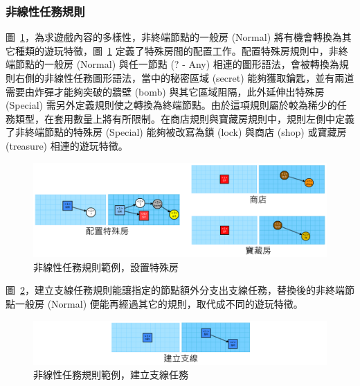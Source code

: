 \subsubsection{非線性任務規則}
\label{sssec:method-missiongrammars-rules-nonlinearrules}

圖~\ref{fig:missiongrammars-rules-nonlinear-example1}，為求遊戲內容的多樣性，非終端節點的一般房 (Normal) 將有機會轉換為其它種類的遊玩特徵，圖~\ref{fig:missiongrammars-rules-nonlinear-example1} 定義了特殊房間的配置工作。配置特殊房規則中，非終端節點的一般房 (Normal) 與任一節點 (? - Any) 相連的圖形語法，會被轉換為規則右側的非線性任務圖形語法，當中的秘密區域 (secret) 能夠獲取鑰匙，並有兩道需要由炸彈才能夠突破的牆壁 (bomb) 與其它區域阻隔，此外延伸出特殊房 (Special) 需另外定義規則使之轉換為終端節點。由於這項規則屬於較為稀少的任務類型，在套用數量上將有所限制。在商店規則與寶藏房規則中，規則左側中定義了非終端節點的特殊房 (Special) 能夠被改寫為鎖 (lock) 與商店 (shop) 或寶藏房 (treasure) 相連的遊玩特徵。

\begin{figure}[ht]
  \begin{center}
    \includegraphics[width=1.0\textwidth]{figures/missiongrammars-rules-nonlinear-example1.png}
    \caption{非線性任務規則範例，設置特殊房}
    \label{fig:missiongrammars-rules-nonlinear-example1}
  \end{center}
\end{figure}

圖~\ref{fig:missiongrammars-rules-nonlinear-example2}，建立支線任務規則能讓指定的節點額外分支出支線任務，替換後的非終端節點一般房 (Normal) 便能再經過其它的規則，取代成不同的遊玩特徵。
 
\begin{figure}[ht]
  \begin{center}
    \includegraphics[width=1.0\textwidth]{figures/missiongrammars-rules-nonlinear-example2.png}
    \caption{非線性任務規則範例，建立支線任務}
    \label{fig:missiongrammars-rules-nonlinear-example2}
  \end{center}
\end{figure}

